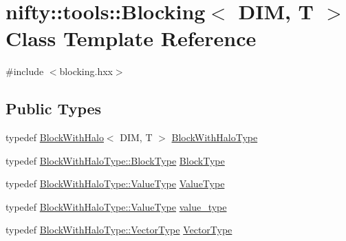 \hypertarget{classnifty_1_1tools_1_1Blocking}{}\section{nifty\+:\+:tools\+:\+:Blocking$<$ D\+IM, T $>$ Class Template Reference}
\label{classnifty_1_1tools_1_1Blocking}


{\ttfamily \#include $<$blocking.\+hxx$>$}

\subsection*{Public Types}
\begin{DoxyCompactItemize}
\item 
typedef \hyperlink{classnifty_1_1tools_1_1BlockWithHalo}{Block\+With\+Halo}$<$ D\+IM, T $>$ \hyperlink{classnifty_1_1tools_1_1Blocking_abebd9361d89cc399bc495861fa4e331d}{Block\+With\+Halo\+Type}
\item 
typedef \hyperlink{classnifty_1_1tools_1_1BlockWithHalo_a98d2c04518f8902ab6d985feba605987}{Block\+With\+Halo\+Type\+::\+Block\+Type} \hyperlink{classnifty_1_1tools_1_1Blocking_a597e0d4186d2d40ccb96698cc16775c6}{Block\+Type}
\item 
typedef \hyperlink{classnifty_1_1tools_1_1BlockWithHalo_a65d120db84dfca7586ae5ab30f26f01b}{Block\+With\+Halo\+Type\+::\+Value\+Type} \hyperlink{classnifty_1_1tools_1_1Blocking_ae04f69cd6e67bbde26eee3f38e0257f7}{Value\+Type}
\item 
typedef \hyperlink{classnifty_1_1tools_1_1BlockWithHalo_a65d120db84dfca7586ae5ab30f26f01b}{Block\+With\+Halo\+Type\+::\+Value\+Type} \hyperlink{classnifty_1_1tools_1_1Blocking_a4ea21e967d25e621a000176dc994c85e}{value\+\_\+type}
\item 
typedef \hyperlink{classnifty_1_1tools_1_1BlockWithHalo_a040d8a654eb42791c6e5fbd4dfd51b9f}{Block\+With\+Halo\+Type\+::\+Vector\+Type} \hyperlink{classnifty_1_1tools_1_1Blocking_a5f8df3d4cdf09803217d729a04018fb3}{Vector\+Type}
\end{DoxyCompactItemize}
